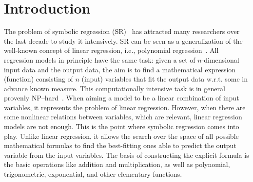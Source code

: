 \documentclass[a4paper,12pt]{elsarticle}
\begin{document}
	
	\section{Introduction}\label{sec:introduction}
	
	The problem of symbolic regression (SR)~\cite{billard2002symbolic} has attracted many researchers over the last decade to study it intensively. SR can be seen as a generalization of the well-known concept of linear regression, i.e., polynomial regression~\cite{stimson1978interpreting}. All regression models in principle have the same task: given a set of $n$-dimensional input data and the output data, the aim is to find a  mathematical expression (function) consisting of $n$ (input) variables that fit the output data w.r.t. some in advance known measure.  This computationally intensive task is in general provenly NP--hard~\cite{virgolin2022symbolic}. When aiming a model to be a linear combination of input variables, it represents the problem of linear regression. However, when there are some nonlinear relations between variables, which are relevant, linear regression models are not enough. This is the point where symbolic regression comes into play. Unlike linear regression, it allows the search over the space of all possible mathematical formulas to find the best-fitting ones able to predict the output variable from the input variables. The basis of constructing the explicit formula is the basic operations like addition and multiplication, as well as polynomial, trigonometric, exponential, and other elementary functions.  
	
\end{document}
